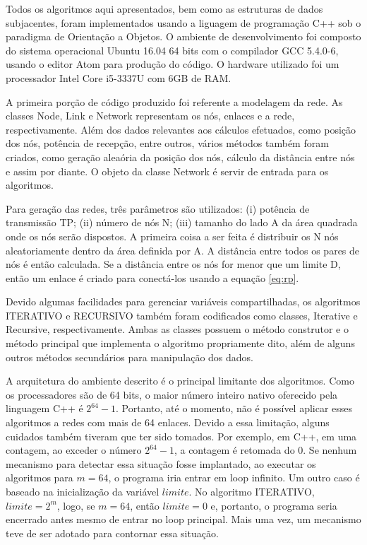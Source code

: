 Todos os algoritmos aqui apresentados, bem como as estruturas de dados subjacentes, foram implementados usando a liguagem de programação C++ sob o paradigma de Orientação a Objetos. O ambiente de desenvolvimento foi composto do sistema operacional Ubuntu 16.04 64 bits com o compilador GCC 5.4.0-6, usando o editor Atom para produção do código. O hardware utilizado foi um processador Intel Core i5-3337U com 6GB de RAM.

A primeira porção de código produzido foi referente a modelagem da rede. As classes Node, Link e Network representam os nós, enlaces e a rede, respectivamente. Além dos dados relevantes aos cálculos efetuados, como posição dos nós, potência de recepção, entre outros, vários métodos também foram criados, como geração aleaória da posição dos nós, cálculo da distância entre nós e assim por diante. O objeto da classe Network é servir de entrada para os algoritmos. 

Para geração das redes, três parâmetros são utilizados: (i) potência de transmissão TP; (ii) número de nós N; (iii) tamanho do lado A da área quadrada onde os nós serão dispostos. A primeira coisa a ser feita é distribuir os N nós aleatoriamente dentro da área definida por A. A distância entre todos os pares de nós é então calculada. Se a distância entre os nós for menor que um limite D, então um enlace é criado para conectá-los usando a equação \ref{eq:rp}.  

Devido algumas facilidades para gerenciar variáveis compartilhadas, os algoritmos ITERATIVO e RECURSIVO também foram codificados como classes, Iterative e Recursive, respectivamente. Ambas as classes possuem o método construtor e o método principal que implementa o algoritmo propriamente dito, além de alguns outros métodos secundários para manipulação dos dados.

A arquitetura do ambiente descrito é o principal limitante dos algoritmos. Como os processadores são de 64 bits, o maior número inteiro nativo oferecido pela linguagem C++ é $2^{64}-1$. Portanto, até o momento, não é possível aplicar esses algoritmos a redes com mais de 64 enlaces. Devido a essa limitação, alguns cuidados também tiveram que ter sido tomados. Por exemplo, em C++, em uma contagem, ao exceder o número $2^{64}-1$, a contagem é retomada do 0. Se nenhum mecanismo para detectar essa situação fosse implantado, ao executar os algoritmos para $m=64$, o programa iria entrar em loop infinito. Um outro caso é baseado na inicialização da variável $limite$. No algoritmo ITERATIVO, $limite = 2^m$, logo, se $m=64$, então $limite=0$ e, portanto, o programa seria encerrado antes mesmo de entrar no loop principal. Mais uma vez, um mecanismo teve de ser adotado para contornar essa situação.

